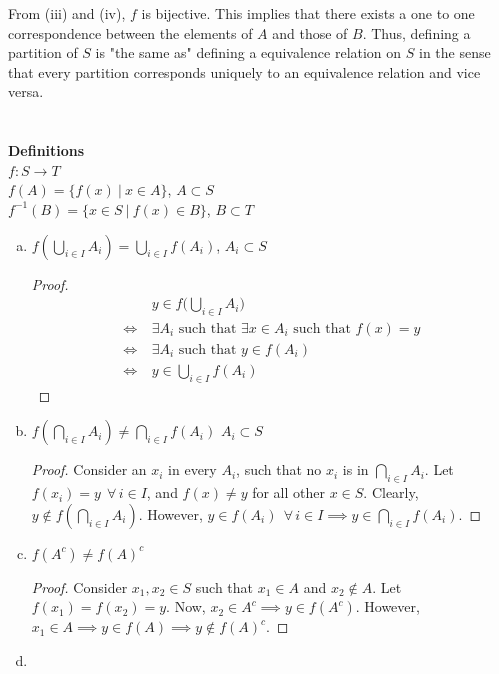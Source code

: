 \documentclass[12pt]{article}
\begin{document}
From (iii) and (iv), $f$ is bijective. This implies that there exists a one to one
correspondence between the elements of $A$ and those of $B$. Thus, defining a partition of
$S$ is "the same as" defining a equivalence relation on $S$ in the sense that every partition
corresponds uniquely to an equivalence relation and vice versa.


\section{}
 {\bf Definitions} \\
$f: S \rightarrow T$ \\
$f(A) = \{f(x) \ |\  x\in A \}$, $A \subset S$ \\
$f^{-1}(B) = \{x\in S \ |\  f(x) \in B\}$, $B \subset T$
\begin{enumerate}[(a)]
      \item $f(\bigcup_{i\in I} A_i) = \bigcup_{i\in I} f(A_i)$,
            $A_i \subset S$
            \begin{proof}
                  \begin{align*}
                                               & y \in f\Big(\bigcup_{i\in I} A_i\Big)                                        \\
                        \Longleftrightarrow \  & \exists A_i \text{ such that } \exists x \in A_i \text{ such that } f(x) = y \\
                        \Longleftrightarrow \  & \exists A_i \text{ such that } y \in f(A_i)                                  \\
                        \Longleftrightarrow \  & y \in \bigcup_{i\in I} f(A_i)
                  \end{align*}
            \end{proof}
      \item $f(\bigcap_{i\in I} A_i) \ne \bigcap_{i\in I} f(A_i)$
            $A_i \subset S$
            \begin{proof}
                  Consider an $x_i$ in every $A_i$, such that no $x_i$ is in $\bigcap_{i\in I} A_i$.
                  Let $f(x_i) = y \ \ \forall \, i \in I$, and $f(x) \ne y$ for all other $x \in S$. Clearly, $y \notin f(\bigcap_{i\in I} A_i)$.
                  However, $y \in f(A_i) \ \ \forall \, i \in I \implies y \in \bigcap_{i\in I} f(A_i).$
            \end{proof}
      \item $f(A^c) \ne f(A)^c$
            \begin{proof}
                  Consider $x_1, x_2 \in S$ such that $x_1 \in A$ and $x_2 \notin A$. Let $f(x_1)
                        = f(x_2) = y$. Now, $x_2 \in A^c \implies y \in f(A^c)$. However, $x_1 \in A \implies
                        y \in f(A) \implies y \notin f(A)^c$.
            \end{proof}
      \item \begin{enumerate}[(i)]


\end{enumerate}
\end{enumerate}
\end{document}
